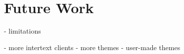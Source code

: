 
\section{Future Work} \label{futureWork}

- limitations

- more intertext clients
- more themes
- user-made themes